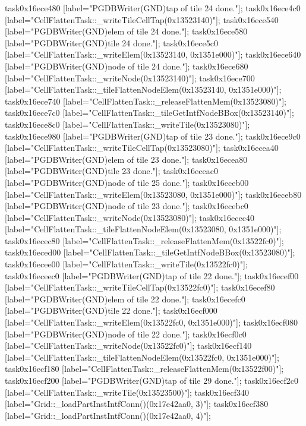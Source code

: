 {	task0x16ece480 [label="PGDBWriter(GND)\nCell tap of tile 24 done."];
	task0x16ece4c0 [label="CellFlattenTask::_writeTileCellTap(0x13523140)"];
	task0x16ece540 [label="PGDBWriter(GND)\nCell elem of tile 24 done."];
	task0x16ece580 [label="PGDBWriter(GND)\nCell tile 24 done."];
	task0x16ece5c0 [label="CellFlattenTask::_writeElem(0x13523140, 0x1351e000)"];
	task0x16ece640 [label="PGDBWriter(GND)\nCell node of tile 24 done."];
	task0x16ece680 [label="CellFlattenTask::_writeNode(0x13523140)"];
	task0x16ece700 [label="CellFlattenTask::_tileFlattenNodeElem(0x13523140, 0x1351e000)"];
	task0x16ece740 [label="CellFlattenTask::_releaseFlattenMem(0x13523080)"];
	task0x16ece7c0 [label="CellFlattenTask::_tileGetIntfNodeBBox(0x13523140)"];
	task0x16ece8c0 [label="CellFlattenTask::_writeTile(0x13523080)"];
	task0x16ece980 [label="PGDBWriter(GND)\nCell tap of tile 23 done."];
	task0x16ece9c0 [label="CellFlattenTask::_writeTileCellTap(0x13523080)"];
	task0x16ecea40 [label="PGDBWriter(GND)\nCell elem of tile 23 done."];
	task0x16ecea80 [label="PGDBWriter(GND)\nCell tile 23 done."];
	task0x16eceac0 [label="PGDBWriter(GND)\nCell node of tile 25 done."];
	task0x16eceb00 [label="CellFlattenTask::_writeElem(0x13523080, 0x1351e000)"];
	task0x16eceb80 [label="PGDBWriter(GND)\nCell node of tile 23 done."];
	task0x16ecebc0 [label="CellFlattenTask::_writeNode(0x13523080)"];
	task0x16ecec40 [label="CellFlattenTask::_tileFlattenNodeElem(0x13523080, 0x1351e000)"];
	task0x16ecec80 [label="CellFlattenTask::_releaseFlattenMem(0x13522fc0)"];
	task0x16eced00 [label="CellFlattenTask::_tileGetIntfNodeBBox(0x13523080)"];
	task0x16ecee00 [label="CellFlattenTask::_writeTile(0x13522fc0)"];
	task0x16eceec0 [label="PGDBWriter(GND)\nCell tap of tile 22 done."];
	task0x16ecef00 [label="CellFlattenTask::_writeTileCellTap(0x13522fc0)"];
	task0x16ecef80 [label="PGDBWriter(GND)\nCell elem of tile 22 done."];
	task0x16ecefc0 [label="PGDBWriter(GND)\nCell tile 22 done."];
	task0x16ecf000 [label="CellFlattenTask::_writeElem(0x13522fc0, 0x1351e000)"];
	task0x16ecf080 [label="PGDBWriter(GND)\nCell node of tile 22 done."];
	task0x16ecf0c0 [label="CellFlattenTask::_writeNode(0x13522fc0)"];
	task0x16ecf140 [label="CellFlattenTask::_tileFlattenNodeElem(0x13522fc0, 0x1351e000)"];
	task0x16ecf180 [label="CellFlattenTask::_releaseFlattenMem(0x13522f00)"];
	task0x16ecf200 [label="PGDBWriter(GND)\nCell tap of tile 29 done."];
	task0x16ecf2c0 [label="CellFlattenTask::_writeTile(0x13523500)"];
	task0x16ecf340 [label="Grid::_loadPartInstIntfConn()(0x17e42aa0, 3)"];
	task0x16ecf380 [label="Grid::_loadPartInstIntfConn()(0x17e42aa0, 4)"];
}
